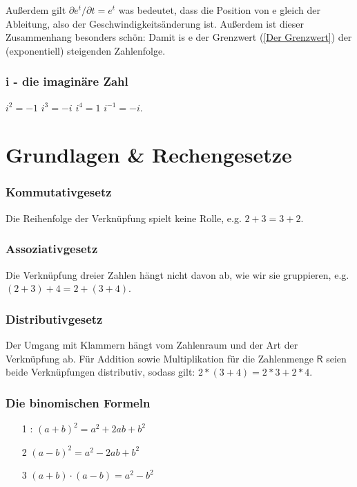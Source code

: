 \documentclass[letterpaper, titlepage]{article}
\begin{document}
\absatzformel
Außerdem gilt $\partial e^t/\partial t=e^t$ was bedeutet, dass die Position von e gleich der Ableitung, also der Geschwindigkeitsänderung ist. Außerdem ist dieser Zusammenhang  besonders schön: 
Damit is e der Grenzwert (\ref{Der Grenzwert}) der (exponentiell) steigenden Zahlenfolge.  

\subsubsection{i - die imaginäre Zahl}\label{i - die imaginäre Zahl}
\begin{center}
    
    $i^2=-1$
    \skiptwolines
    $i^3=-i$
    \skiptwolines
    $i^4=1$
    \skiptwolines
    $i^{-1}=-i$.
    \newline
\end{center}


\section{Grundlagen \& Rechengesetze}\label{Grundlegende Rechengesetze}


\subsubsection{Kommutativgesetz}\label{Kommutativgesetz}
Die Reihenfolge der Verknüpfung spielt keine Rolle, e.g. $2+3=3+2$. 

\subsubsection{Assoziativgesetz}\label{Assoziativgesetz}
Die Verknüpfung dreier Zahlen hängt nicht davon ab, wie wir sie gruppieren, e.g. $(2 + 3) + 4 = 2 + (3 + 4)$. 

\subsubsection{Distributivgesetz}\label{Distributivgesetz}
Der Umgang mit Klammern hängt vom Zahlenraum und der Art der Verknüpfung ab. Für Addition sowie Multiplikation für die Zahlenmenge $\mathsf{R}$ seien beide Verknüpfungen distributiv, sodass gilt: $2*(3+4)=2*3+2*4$. \hfill \break

\subsubsection{Die binomischen Formeln}
\begin{enumerate}
    \item[1]: $(a+b)^2=a^2+2ab+b^2$
    \item[2] $(a-b)^2=a^2-2ab+b^2$
    \item[3]  $(a+b)\cdot(a-b)=a^2-b^2$
\end{enumerate}
\end{document}
